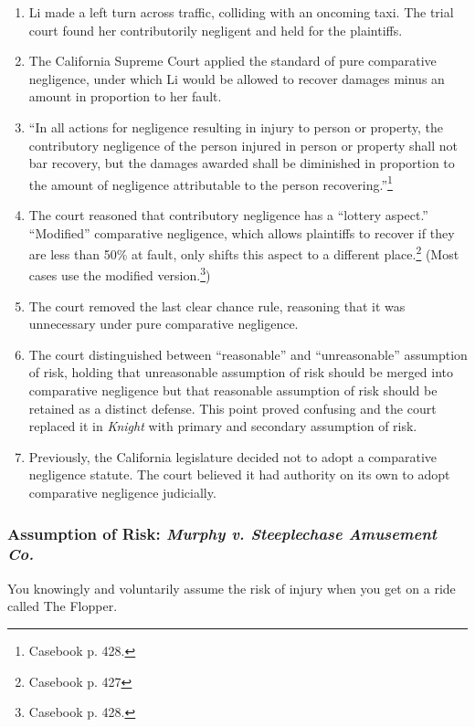 \begin{enumerate}
    \item Li made a left turn across traffic, colliding with an oncoming taxi. 
    The trial court found her contributorily negligent and held for the 
    plaintiffs.
    \item The California Supreme Court applied the standard of pure 
    comparative negligence, under which Li would be allowed to recover damages 
    minus an amount in proportion to her fault.
    \item ``In all actions for negligence resulting in injury to person or 
    property, the contributory negligence of the person injured in person or 
    property shall not bar recovery, but the damages awarded shall be 
    diminished in proportion to the amount of negligence attributable to the 
    person recovering.''\footnote{Casebook p. 428.}
    \item The court reasoned that contributory negligence has a ``lottery aspect.'' ``Modified'' comparative negligence, which allows plaintiffs to recover if they are less than 50\% at fault, only shifts this aspect to a different place.\footnote{Casebook p. 427} (Most cases use the modified version.\footnote{Casebook p. 428.})
    \item The court removed the last clear chance rule, reasoning that it was 
    unnecessary under pure comparative negligence.
    \item The court distinguished between ``reasonable'' and ``unreasonable'' 
    assumption of risk, holding that unreasonable assumption of risk should be merged 
    into comparative negligence but that reasonable assumption of risk should 
    be retained as a distinct defense. This point proved confusing and the 
    court replaced it in \emph{Knight} with primary and secondary assumption 
    of risk.
    \item Previously, the California legislature decided not to adopt a 
    comparative negligence statute. The court believed it had authority on its 
    own to adopt comparative negligence judicially.
\end{enumerate}

\subsubsection{Assumption of Risk: \emph{Murphy v. Steeplechase Amusement 
Co.}}

You knowingly and voluntarily assume the risk of injury when you get on a ride 
called The Flopper.

